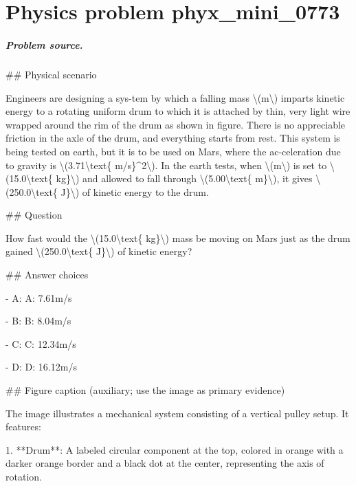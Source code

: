 
\chapter{Physics problem phyx\_mini\_0773}
\label{ch:PhyXMiniProblems_problem_phyx_mini_0773}

\paragraph{Problem source.}
\#\# Physical scenario

Engineers are designing a sys-tem by which a falling mass \textbackslash{}(m\textbackslash{}) imparts kinetic energy to a rotating uniform drum to which it is attached by thin, very light wire wrapped around the rim of the drum as shown in figure. There is no appreciable friction in the axle of the drum, and everything starts from rest. This system is being tested on earth, but it is to be used on Mars, where the ac-celeration due to gravity is \textbackslash{}(3.71\textbackslash{}text\{ m/s\}\textasciicircum{}2\textbackslash{}). In the earth tests, when \textbackslash{}(m\textbackslash{}) is set to \textbackslash{}(15.0\textbackslash{}text\{ kg\}\textbackslash{}) and allowed to fall through \textbackslash{}(5.00\textbackslash{}text\{ m\}\textbackslash{}), it gives \textbackslash{}(250.0\textbackslash{}text\{ J\}\textbackslash{}) of kinetic energy to the drum.

\#\# Question

How fast would the \textbackslash{}(15.0\textbackslash{}text\{ kg\}\textbackslash{}) mass be moving on Mars just as the drum gained \textbackslash{}(250.0\textbackslash{}text\{ J\}\textbackslash{}) of kinetic energy?

\#\# Answer choices

- A: A: 7.61m/s

- B: B: 8.04m/s

- C: C: 12.34m/s

- D: D: 16.12m/s

\#\# Figure caption (auxiliary; use the image as primary evidence)

The image illustrates a mechanical system consisting of a vertical pulley setup. It features:

1. **Drum**: A labeled circular component at the top, colored in orange with a darker orange border and a black dot at the center, representing the axis of rotation.

